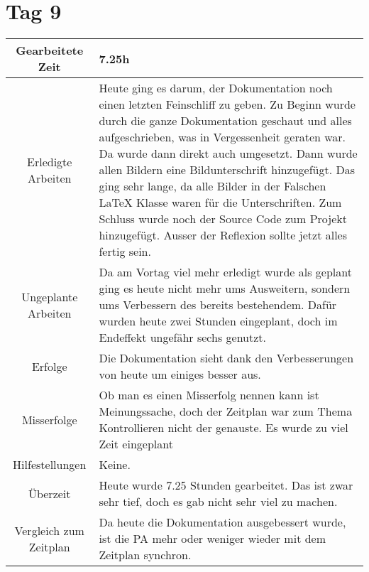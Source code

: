 \section{Tag 9}
\begin{tabularx}{\textwidth}[H]{|c|X|}
  \hline
  Gearbeitete Zeit & 7.25h \\ \hline
  Erledigte Arbeiten & Heute ging es darum, der Dokumentation noch einen letzten Feinschliff zu geben. Zu Beginn wurde
  durch die ganze Dokumentation geschaut und alles aufgeschrieben, was in Vergessenheit geraten war. Da wurde dann
  direkt auch umgesetzt. \newline
  Dann wurde allen Bildern eine Bildunterschrift hinzugefügt. Das ging sehr lange, da alle Bilder in der Falschen
  LaTeX Klasse waren für die Unterschriften. \newline
  Zum Schluss wurde noch der Source Code zum Projekt hinzugefügt. Ausser der Reflexion sollte jetzt alles fertig
  sein. \\ \hline
  Ungeplante Arbeiten & Da am Vortag viel mehr erledigt wurde als geplant ging es heute nicht mehr ums Ausweitern,
  sondern ums Verbessern des bereits bestehendem. Dafür wurden heute zwei Stunden eingeplant, doch im Endeffekt
  ungefähr sechs genutzt. \\ \hline
  Erfolge & Die Dokumentation sieht dank den Verbesserungen von heute um einiges besser aus. \\ \hline
  Misserfolge & Ob man es einen Misserfolg nennen kann ist Meinungssache, doch der Zeitplan war zum Thema Kontrollieren
  nicht der genauste. Es wurde zu viel Zeit eingeplant \\ \hline
  Hilfestellungen & Keine. \\ \hline
  Überzeit & Heute wurde 7.25 Stunden gearbeitet. Das ist zwar sehr tief, doch es gab nicht sehr viel zu machen. \\ \hline
  Vergleich zum Zeitplan & Da heute die Dokumentation ausgebessert wurde, ist die PA mehr oder weniger wieder mit dem
  Zeitplan synchron. \\ \hline 
\end{tabularx}

\newpage

